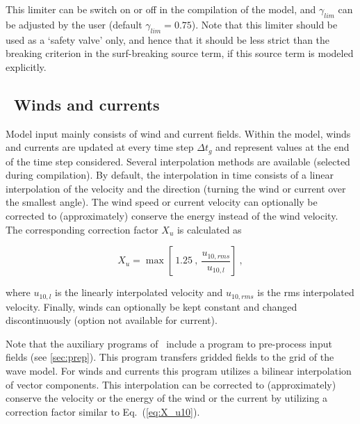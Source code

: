 This limiter can be switch on or off in the compilation of the model, and
$\gamma_{lim}$ can be adjusted by the user (default $\gamma_{lim} =
0.75$). Note that this limiter should be used as a `safety valve' only, and
hence that it should be less strict than the breaking criterion in the
surf-breaking source term, if this source term is modeled explicitly.


\pb
\vssub
\subsection{~Winds and currents}
\vssub

\noindent
Model input mainly consists of wind and current fields. Within the model,
winds and currents are updated at every time step $\Delta t_g$ and represent
values at the end of the time step considered. Several interpolation methods
are available (selected during compilation). By default, the interpolation in
time consists of a linear interpolation of the velocity and the direction
(turning the wind or current over the smallest angle). The wind speed or
current velocity can optionally be corrected to (approximately) conserve the
energy instead of the wind velocity. The corresponding correction factor $X_u$
is calculated as


\begin{equation}
X_u = \max \left [ \: 1.25 \: , \: \frac{u_{10,rms}}{u_{10,l}}
\right ] \: , \label{eq:X_u10} \end{equation}

\noindent
where $u_{10,l}$ is the linearly interpolated velocity and $u_{10,rms}$ is the
rms interpolated velocity. Finally, winds can optionally be kept constant and
changed discontinuously (option not available for current).

\vspace{\baselineskip} \noindent 
Note that the auxiliary programs of \ws\ include a program to pre-process
input fields (see \para\ref{sec:prep}). This program transfers gridded fields
to the grid of the wave model. For winds and currents this program utilizes a
bilinear interpolation of vector components. This interpolation can be
corrected to (approximately) conserve the velocity or the energy of the wind
or the current by utilizing a correction factor similar to
Eq.~(\ref{eq:X_u10}).


\vssub
